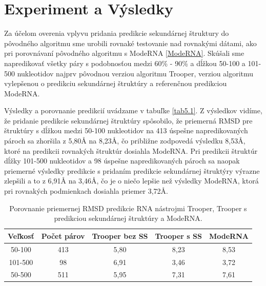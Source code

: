 \section{Experiment a Výsledky}
Za účelom overenia vplyvu pridania predikcie sekundárnej štruktury do pôvodného algoritmu sme urobili rovnaké testovanie nad rovnakými dátami, ako pri porovnávaní pôvodného algoritmu s ModeRNA \autoref{ModeRNA}. Skúšali sme napredikovať všetky páry s podobnosťou medzi 60\% - 90\% a dĺžkou 50-100 a 101-500 nukleotidov najprv pôvodnou verziou algoritmu Trooper, verziou algoritmu vylepšenou o predikciu sekundárnej štruktúry a referenčnou predikciou ModeRNA. 


\indent  Výsledky a porovnanie predikcií uvádzame v tabuľke \autoref{tab5.1}. Z výsledkov vidíme, že pridanie predikcie sekundárnej štruktúry spôsobilo, že priemerná RMSD pre štruktúry s dĺžkou medzi 50-100 nukleotidov na 413 úspešne napredikovaných pároch sa zhoršila z 5,80Å na 8,23Å, čo približne zodpovedá výsledku 8,53Å, ktoré na predikcii rovnakých štruktúr dosiahla ModeRNA. Pri predikcii štruktúr dĺžky 101-500 nukleotidov a 98 úspešne napredikovaných pároch sa naopak priemerné výsledky predikcie s pridaním predikcie sekundárnej štruktýry výrazne zlepšili a to z 6,91Å na 3,46Å, čo je o niečo lepšie než výsledky ModeRNA, ktorá pri rovnakých podmienkach dosiahla priemer 3,72Å. 
\begin{table}[b!]
\centering
\begin{tabular}{ccccc}
\toprule
Veľkosť & Počet párov & Trooper bez SS & Trooper s SS & ModeRNA\\
\midrule
50-100  & 413 & 5,80  & 8,23 & 8,53\\
101-500  & 98 & 6,91  & 3,46 & 3,72\\
\bottomrule
50-500  &  511 & 5,95  & 7,31 & 7,61\\
\end{tabular}
\caption{Porovnanie priemernej RMSD predikcie RNA nástrojmi Trooper, Trooper s predikciou sekundárnej štruktúry a ModeRNA. }\label{tab5.1}
\end{table}


